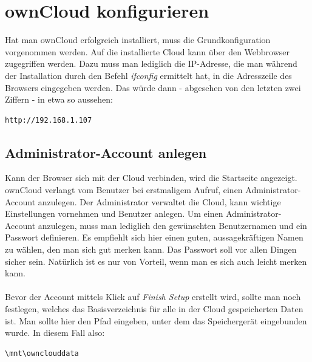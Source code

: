 \section{ownCloud konfigurieren}
Hat man ownCloud erfolgreich installiert, muss die Grundkonfiguration vorgenommen werden. Auf die installierte Cloud kann über den Webbrowser zugegriffen werden. Dazu muss man lediglich die IP-Adresse, die man während der Installation durch den Befehl \textit{ifconfig} ermittelt hat, in die Adresszeile des Browsers eingegeben werden. Das würde dann - abgesehen von den letzten zwei Ziffern - in etwa so aussehen:

\begin{lstlisting}
http://192.168.1.107
\end{lstlisting}

\subsection{Administrator-Account anlegen}
Kann der Browser sich mit der Cloud verbinden, wird die Startseite angezeigt. ownCloud verlangt vom Benutzer bei erstmaligem Aufruf, einen Administrator-Account anzulegen. Der Administrator verwaltet die Cloud, kann wichtige Einstellungen vornehmen und Benutzer anlegen.
Um einen Administrator-Account anzulegen, muss man lediglich den gewünschten Benutzernamen und ein Passwort definieren. Es empfiehlt sich hier einen guten, aussagekräftigen Namen zu wählen, den man sich gut merken kann. Das Passwort soll vor allen Dingen sicher sein. Natürlich ist es nur von Vorteil, wenn man es sich auch leicht merken kann.
\\
\\
Bevor der Account mittels Klick auf \textit{Finish Setup} erstellt wird, sollte man noch festlegen, welches das Basisverzeichnis für alle in der Cloud gespeicherten Daten ist. Man sollte hier den Pfad eingeben, unter dem das Speichergerät eingebunden wurde. In diesem Fall also:

\begin{lstlisting}
\mnt\ownclouddata
\end{lstlisting}


